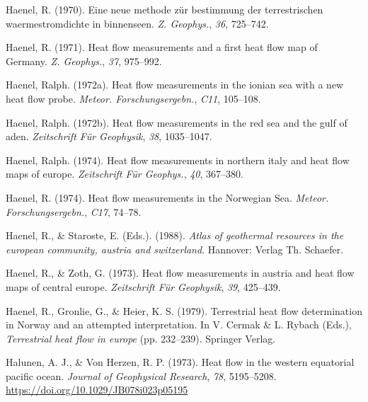 \documentclass[draft,linenumbers]{agujournal2018}
\begin{document}
\leavevmode{}%
Haenel, R. (1970). Eine neue methode zür bestimmung der terrestrischen
waermestromdichte in binnenseen. \emph{Z. Geophys.}, \emph{36},
725--742.

\leavevmode{}%
Haenel, R. (1971). Heat flow measurements and a first heat flow map of
{Germany}. \emph{Z. Geophys.}, \emph{37}, 975--992.

\leavevmode{}%
Haenel, Ralph. (1972a). Heat flow measurements in the ionian sea with a
new heat flow probe. \emph{Meteor. Forschungsergebn.}, \emph{C11},
105--108.

\leavevmode{}%
Haenel, Ralph. (1972b). Heat flow measurements in the red sea and the
gulf of aden. \emph{Zeitschrift Für Geophysik}, \emph{38}, 1035--1047.

\leavevmode{}%
Haenel, Ralph. (1974). Heat flow measurements in northern italy and heat
flow maps of europe. \emph{Zeitschrift Für Geophys.}, \emph{40},
367--380.

\leavevmode{}%
Haenel, R. (1974). Heat flow measurements in the {Norwegian Sea}.
\emph{Meteor. Forschungsergebn.}, \emph{C17}, 74--78.

\leavevmode{}%
Haenel, R., \& Staroste, E. (Eds.). (1988). \emph{Atlas of geothermal
resources in the european community, austria and switzerland}. Hannover:
Verlag Th. Schaefer.

\leavevmode{}%
Haenel, R., \& Zoth, G. (1973). Heat flow measurements in austria and
heat flow maps of central europe. \emph{Zeitschrift Für Geophysik},
\emph{39}, 425--439.

\leavevmode{}%
Haenel, R., Gronlie, G., \& Heier, K. S. (1979). Terrestrial heat flow
determination in {Norway} and an attempted interpretation. In V. Cermak
\& L. Rybach (Eds.), \emph{Terrestrial heat flow in europe} (pp.
232--239). Springer Verlag.

\leavevmode{}%
Halunen, A. J., \& Von Herzen, R. P. (1973). Heat flow in the western
equatorial pacific ocean. \emph{Journal of Geophysical Research},
\emph{78}, 5195--5208. \url{https://doi.org/10.1029/JB078i023p05195}
\end{document}
